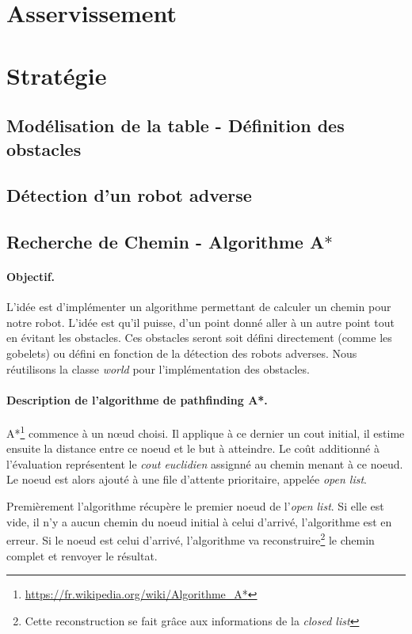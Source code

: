 \documentclass[a4paper,10pt]{report}
\begin{document}
\begin{spacing}{1.5}
\section{Asservissement}
\section{Stratégie}
\subsection{Modélisation de la table - Définition des obstacles}
\subsection{Détection d'un robot adverse}
\subsection{Recherche de Chemin - Algorithme A$\ast$}
\paragraph{Objectif.} L'idée est d'implémenter un algorithme permettant de
calculer un chemin pour notre robot. L'idée est qu'il puisse, d'un point donné
aller à un autre point tout en évitant les obstacles. Ces obstacles seront soit
défini directement (comme les gobelets) ou défini en fonction de la détection
des robots adverses. Nous réutilisons la classe \textit{world} pour
l'implémentation des obstacles.
\paragraph{Description de l'algorithme de pathfinding A*.}
A*\footnote{\url{https://fr.wikipedia.org/wiki/Algorithme_A*}} commence à un
nœud choisi. Il applique à ce dernier un cout initial, il estime ensuite la
distance entre ce noeud et le but à atteindre. Le coût additionné à l'évaluation
représentent le \textit{cout euclidien} assignné au chemin menant à ce noeud.
Le noeud est alors ajouté à une file d'attente prioritaire, appelée \textit{open
list}.

Premièrement l'algorithme récupère le premier noeud de l'\textit{open list}. Si
elle est vide, il n'y a aucun chemin du noeud initial à celui d'arrivé,
l'algorithme est en erreur. Si le noeud est celui d'arrivé, l'algorithme va
reconstruire\footnote{Cette reconstruction se fait grâce aux informations de la
  \textit{closed list}} le chemin complet et renvoyer le résultat.


\end{spacing}
\end{document}
